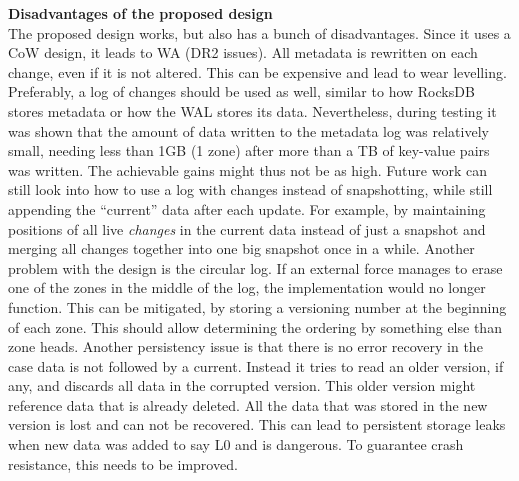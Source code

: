 \textbf{Disadvantages of the proposed design}\\
The proposed design works, but also has a bunch of disadvantages. Since it uses a CoW design, it leads to WA (DR2 issues). All metadata is rewritten on each change, even if it is not altered. This can be expensive and lead to wear levelling. Preferably, a log of changes should be used as well, similar to how RocksDB stores metadata or how the WAL stores its data. Nevertheless, during testing it was shown that the amount of data written to the metadata log was relatively small, needing less than 1GB (1 zone) after more than a TB of key-value pairs was written. The achievable gains might thus not be as high. Future work can still look into how to use a log with changes instead of snapshotting, while still appending the ``current'' data after each update. For example, by maintaining positions of all live \textit{changes} in the current data instead of just a snapshot and merging all changes together into one big snapshot once in a while. Another problem with the design is the circular log. If an external force manages to erase one of the zones in the middle of the log, the implementation would no longer function. This can be mitigated, by storing a versioning number at the beginning of each zone. This should allow determining the ordering by something else than zone heads. Another persistency issue is that there is no error recovery in the case data is not followed by a current. Instead it tries to read an older version, if any, and discards all data in the corrupted version. This older version might reference data that is already deleted. All the data that was stored in the new version is lost and can not be recovered. This can lead to persistent storage leaks when new data was added to say L0 and is dangerous. To guarantee crash resistance, this needs to be improved.

